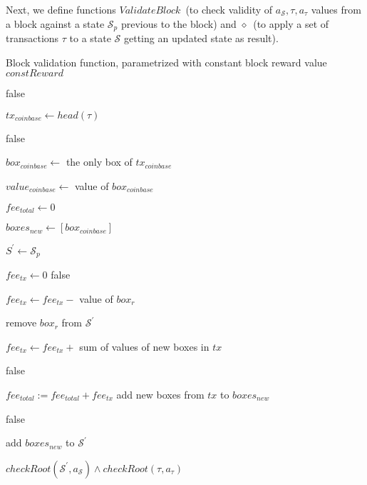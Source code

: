 \documentclass[conference,compsoc]{IEEEtran}
\begin{document}
Next, we define functions $ValidateBlock$~(to check validity of \(a_\mathcal{S}, \tau, a_\tau\) values from a block against a state \(\mathcal{S}_p\) previous to the block) and $\diamond$~(to apply a set of transactions $\tau$ to a state $\mathcal{S}$ getting an updated state as result).

\begin{algorithm}[H]
\caption{Block validation function, parametrized with constant block reward value \(constReward\)}
\label{algo_validate_block}
\begin{algorithmic}[1]

\Return false
\EndIf

\State \( tx_{coinbase} \gets head(\tau) \)


\Return false
\EndIf

\State $ box_{coinbase} \gets $ the only box of $ tx_{coinbase} $

\State $ value_{coinbase} \gets $ value of $ box_{coinbase} $

\State $ fee_{total} \gets 0 $

\State $ boxes_{new} \gets [box_{coinbase}] $

\State \(S^{\prime} \gets \mathcal{S}_p\)

\State $ fee_{tx} \gets 0 $
\Return false
\EndIf

\State $ fee_{tx} \gets fee_{tx} - $ value of $box_r$

\State remove \(box_r\) from \(\mathcal{S}^{\prime}\)
\EndFor

\State $ fee_{tx} \gets fee_{tx} + $ sum of values of new boxes in \(tx\) 

\Return false
\EndIf

\State $ fee_{total} := fee_{total} + fee_{tx} $
\State add new boxes from $tx$ to $boxes_{new}$
\EndFor


\Return false
\EndIf

\State add \(boxes_{new}\) to \(\mathcal{S}^{\prime}\)

\State \Return \( checkRoot(\mathcal{S}^{\prime}, a_\mathcal{S}) \land checkRoot(\tau, a_{\tau}) \)

\EndFunction
\end{algorithmic}
\end{algorithm}
\end{document}
